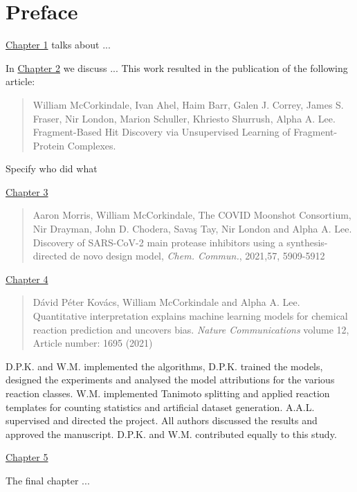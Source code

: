 \chapter*{Preface}
\hyperref[ch:intro]{Chapter 1} talks about ...

In \hyperref[ch:fresco]{Chapter 2} we discuss ... This work resulted in the publication of the following article:
\begin{quote}
William McCorkindale, Ivan Ahel, Haim Barr, Galen J. Correy, James S. Fraser, Nir London, Marion Schuller, Khriesto Shurrush, Alpha A. Lee. Fragment-Based Hit Discovery via Unsupervised Learning of Fragment-Protein Complexes.
\end{quote}
Specify who did what

\hyperref[ch:ranking]{Chapter 3}
\begin{quote}
Aaron Morris, William McCorkindale, The COVID Moonshot Consortium, Nir Drayman, John D. Chodera, Savaş Tay, Nir London and Alpha A. Lee. Discovery of SARS-CoV-2 main protease inhibitors using a synthesis-directed de novo design model, \textit{Chem. Commun.}, 2021,57, 5909-5912 
\end{quote}

\hyperref[ch:transformer]{Chapter 4}
\begin{quote}
Dávid Péter Kovács, William McCorkindale and Alpha A. Lee. Quantitative interpretation explains machine learning models for chemical reaction prediction and uncovers bias. \textit{Nature Communications} volume 12, Article number: 1695 (2021)
\end{quote}

D.P.K. and W.M. implemented the algorithms, D.P.K. trained the models, designed the experiments and analysed the model attributions for the various reaction classes. W.M. implemented Tanimoto splitting and applied reaction templates for counting statistics and artificial dataset generation. A.A.L. supervised and directed the project. All authors discussed the results and approved the manuscript. D.P.K. and W.M. contributed equally to this study.

\hyperref[ch:testing]{Chapter 5}

The final chapter ...